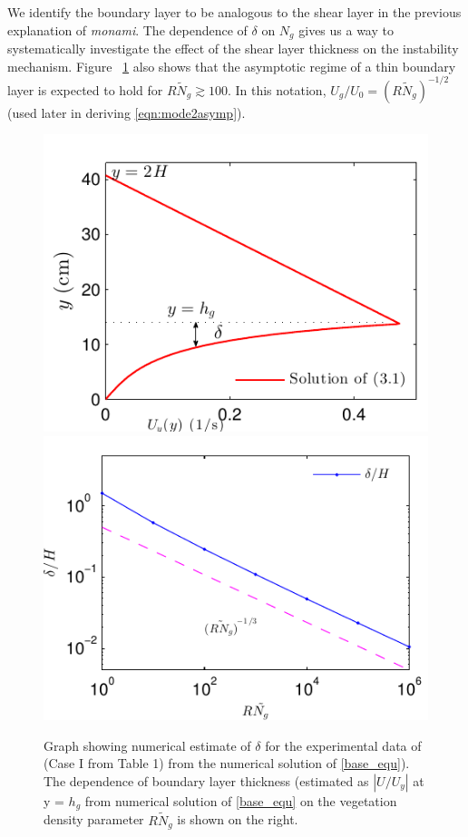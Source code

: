 \documentclass[12pt]{report}   %
\newcommand{\Rey}{{R}}
\newcommand{\Ndg}{\tilde{N}_g}
\newcommand{\monami}{\textit{monami}}
\newcommand{\ReyNdg}{{\Rey\Ndg}}
\begin{document}
We identify the boundary layer to be analogous to the shear layer \cite{Ghisal02,Nepf04} in the previous explanation of \monami.
The dependence of $\delta$ on $N_g$ gives us a way to systematically investigate the effect of the shear layer thickness on the instability mechanism.
Figure ~\ref{Uy_base} also shows that the asymptotic regime of a thin boundary layer is expected to hold for $\ReyNdg \gtrsim 100$. 
In this notation, $U_g/U_0 = (\Rey \Ndg)^{-1/2}$ (used later in deriving \eqref{eqn:mode2asymp}). 
\begin{figure}
\centerline{\includegraphics[scale=1.]{Grass_Base_Nepf_shear_scale} \includegraphics[scale=1.]{Grass_shear_scale}}
\caption{Graph showing numerical estimate of $\delta$ for the experimental data of \cite{Nepf04} (Case I from Table 1) from the numerical solution of \eqref{base_equ}). The dependence of boundary layer thickness (estimated as $|U/U_y|$ at y = $h_g$ from numerical solution of \ref{base_equ} on the vegetation density parameter $R\Ndg$ is shown on the right.
}
\label{Uy_base}
\end{figure}
\end{document}
